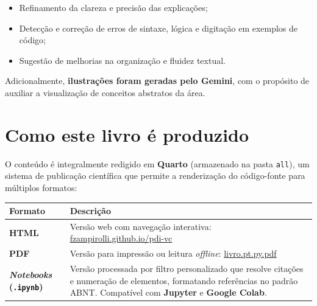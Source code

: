 \documentclass[
  portuguese,
  letterpaper,
  openany,
  oneside,
  12pt,
  a4paper]{book}
\providecommand{\tightlist}{%
  \setlength{\itemsep}{0pt}\setlength{\parskip}{0pt}}
\begin{document}
\begin{itemize}
\tightlist
\item
  Refinamento da clareza e precisão das explicações;
\item
  Detecção e correção de erros de sintaxe, lógica e digitação em
  exemplos de código;
\item
  Sugestão de melhorias na organização e fluidez textual.
\end{itemize}

Adicionalmente, \textbf{ilustrações foram geradas pelo Gemini}, com o
propósito de auxiliar a visualização de conceitos abstratos da área.

\section*{Como este livro é
produzido}\label{como-este-livro-uxe9-produzido}


O conteúdo é integralmente redigido em \textbf{Quarto} (armazenado na
pasta \texttt{all}), um sistema de publicação científica que permite a
renderização do código-fonte para múltiplos formatos:

\begin{longtable}[]{@{}
  >{\raggedright\arraybackslash}p{}
  >{\raggedright\arraybackslash}p{}@{}}
\toprule\noalign{}
\begin{minipage}[b]{\linewidth}\raggedright
Formato
\end{minipage} & \begin{minipage}[b]{\linewidth}\raggedright
Descrição
\end{minipage} \\
\midrule\noalign{}
\endhead
\bottomrule\noalign{}
\endlastfoot
\textbf{HTML} & Versão web com navegação interativa:
\href{https://fzampirolli.github.io/pdi-vc/}{fzampirolli.github.io/pdi-vc} \\
\textbf{PDF} & Versão para impressão ou leitura \emph{offline}:
\href{https://github.com/fzampirolli/pdi-vc/blob/master/gen/book/py.pt/livro.pt.py.pdf}{livro.pt.py.pdf} \\
\textbf{\emph{Notebooks} (\texttt{.ipynb})} & Versão processada por
filtro personalizado que resolve citações e numeração de elementos,
formatando referências no padrão ABNT. Compatível com \textbf{Jupyter} e
\textbf{Google Colab}. \\
\end{longtable}
\end{document}
